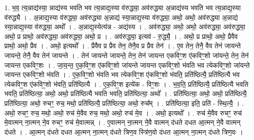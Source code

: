 \documentclass[17pt]{extarticle}
\begin{document}
1. भ॒व॒ त्य॒न्नाद्य॑स्या॒ न्नाद्य॑स्य भवति भव त्य॒न्नाद्य॒स्या व॑रुद्ध्या॒ अव॑रुद्ध्या अ॒न्नाद्य॑स्य भवति भव त्य॒न्नाद्य॒स्या व॑रुद्ध्यै । . अ॒न्नाद्य॒स्या व॑रुद्ध्या॒ अव॑रुद्ध्या अ॒न्नाद्य॑ स्या॒न्नाद्य॒स्या व॑रुद्ध्या॒ अथो॒ अथो॒ अव॑रुद्ध्या अ॒न्नाद्य॑ स्या॒न्नाद्य॒स्या व॑रुद्ध्या॒ अथो᳚ । . अ॒न्नाद्य॒स्येत्य॑न्न - अद्य॑स्य । . अव॑रुद्ध्या॒ अथो॒ अथो॒ अव॑रुद्ध्या॒ अव॑रुद्ध्या॒ अथो॒ प्र प्राथो॒ अव॑रुद्ध्या॒ अव॑रुद्ध्या॒ अथो॒ प्र । . अव॑रुद्ध्या॒ इत्यव॑ - रु॒द्ध्यै॒ । . अथो॒ प्र प्राथो॒ अथो॒ प्रैवैव प्राथो॒ अथो॒ प्रैव । . अथो॒ इत्यथो᳚ । . प्रैवैव प्र प्रैव तेन॒ तेनै॒व प्र प्रैव तेन॑ । . ए॒व तेन॒ तेनै॒ वैव तेन॑ जायन्ते जायन्ते॒ तेनै॒ वैव तेन॑ जायन्ते । . तेन॑ जायन्ते जायन्ते॒ तेन॒ तेन॑ जायन्त एकविꣳ॒॒श ए॑कविꣳ॒॒शो जा॑यन्ते॒ तेन॒ तेन॑ जायन्त एकविꣳ॒॒शः । . जा॒य॒न्त॒ ए॒क॒विꣳ॒॒श ए॑कविꣳ॒॒शो जा॑यन्ते जायन्त एकविꣳ॒॒शो भ॑वति भव त्येकविꣳ॒॒शो जा॑यन्ते जायन्त एकविꣳ॒॒शो भ॑वति । . ए॒क॒विꣳ॒॒शो भ॑वति भव त्येकविꣳ॒॒श ए॑कविꣳ॒॒शो भ॑वति॒ प्रति॑ष्ठित्यै॒ प्रति॑ष्ठित्यै भव त्येकविꣳ॒॒श ए॑कविꣳ॒॒शो भ॑वति॒ प्रति॑ष्ठित्यै । . ए॒क॒विꣳ॒॒श इत्ये॑क - विꣳ॒॒शः । . भ॒व॒ति॒ प्रति॑ष्ठित्यै॒ प्रति॑ष्ठित्यै भवति भवति॒ प्रति॑ष्ठित्या॒ अथो॒ अथो॒ प्रति॑ष्ठित्यै भवति भवति॒ प्रति॑ष्ठित्या॒ अथो᳚ । . प्रति॑ष्ठित्या॒ अथो॒ अथो॒ प्रति॑ष्ठित्यै॒ प्रति॑ष्ठित्या॒ अथो॒ रुचꣳ॒॒ रुच॒ मथो॒ प्रति॑ष्ठित्यै॒ प्रति॑ष्ठित्या॒ अथो॒ रुच᳚म् । . प्रति॑ष्ठित्या॒ इति॒ प्रति॑ - स्थि॒त्यै॒ । . अथो॒ रुचꣳ॒॒ रुच॒ मथो॒ अथो॒ रुच॑ मे॒वैव रुच॒ मथो॒ अथो॒ रुच॑ मे॒व । . अथो॒ इत्यथो᳚ । . रुच॑ मे॒वैव रुचꣳ॒॒ रुच॑ मे॒वात्मन् ना॒त्मन् ने॒व रुचꣳ॒॒ रुच॑ मे॒वात्मन्न् । . ए॒वात्मन् ना॒त्मन् ने॒वै वात्मन् द॑धते दधत आ॒त्मन् ने॒वै वात्मन् द॑धते । . आ॒त्मन् द॑धते दधत आ॒त्मन् ना॒त्मन् द॑धते त्रिण॒व स्त्रि॑ण॒वो द॑धत आ॒त्मन् ना॒त्मन् द॑धते त्रिण॒वः । \newline
\end{document}
